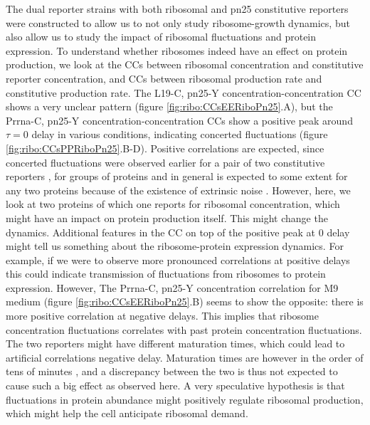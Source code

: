 The dual reporter strains with both ribosomal and pn25 constitutive reporters were constructed to allow us to not only study ribosome-growth dynamics, but also allow us to study the impact of ribosomal fluctuations and protein expression.
%
To understand whether ribosomes indeed have an effect on protein production, we look at the CCs between ribosomal concentration and constitutive reporter concentration, and CCs between ribosomal production rate and constitutive production rate.
%
The L19-C, pn25-Y concentration-concentration CC shows a very unclear pattern (figure \ref{fig:ribo:CCsEERiboPn25}.A), 
but the Prrna-C, pn25-Y concentration-concentration CCs show a positive peak around $\tau = 0$ delay in various conditions, indicating concerted fluctuations (figure \ref{fig:ribo:CCsPPRiboPn25}.B-D).
%
Positive correlations are expected, since concerted fluctuations were observed earlier for a pair of two constitutive reporters \cite{Elowitz2002}, for groups of proteins \cite{Stewart-Ornstein2012} and in general is expected to some extent for any two proteins because of the existence of extrinsic noise \cite{Chalancon2012}.
%
However, here, we look at two proteins of which one reports for ribosomal concentration, which might have an impact on protein production itself.
This might change the dynamics.
%
Additional features in the CC on top of the positive peak at 0 delay might tell us something about the ribosome-protein expression dynamics.
%
For example, if we were to observe more pronounced correlations at positive delays 
this could indicate transmission of fluctuations from ribosomes to protein expression.
%
However, The Prrna-C, pn25-Y concentration correlation for M9 medium (figure \ref{fig:ribo:CCsEERiboPn25}.B) seems to show the opposite: there is more positive correlation at negative delays.
This implies that ribosome concentration fluctuations correlates with past protein concentration fluctuations.
%
The two reporters might have different maturation times, which could lead to artificial correlations negative delay.
%
Maturation times are however in the order of tens of minutes \cite{Iizuka2011, Walker2016t}, and a discrepancy between the two is thus not expected to cause such a big effect as observed here.
%
A very speculative hypothesis is that 
fluctuations in protein abundance might positively regulate ribosomal production,
which might help the cell anticipate ribosomal demand.%

